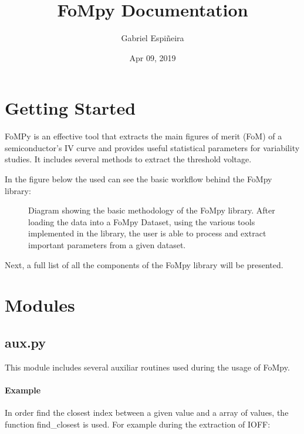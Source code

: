 \documentclass[letterpaper,10pt,english,openany, oneside]{sphinxmanual}
\title{FoMpy Documentation}
\date{Apr 09, 2019}
\author{Gabriel Espiñeira}
\let\sphinxpxdimen\pdfpxdimen\else\newdimen\sphinxpxdimen
\begin{document}
\pagestyle{empty}
\maketitle
\pagestyle{plain}
\sphinxtableofcontents
\pagestyle{normal}
\label{\detokenize{index::doc}}



\chapter{Getting Started}
\label{\detokenize{index:getting-started}}
FoMPy is an effective tool that extracts the main figures of merit (FoM) of a semiconductor’s IV curve and provides useful statistical parameters for variability studies. It includes several methods to extract the threshold voltage.

In the figure below the used can see the basic workflow behind the FoMpy library:

\begin{figure}[htbp]
\centering
\capstart

\noindent\sphinxincludegraphics[width=600\sphinxpxdimen,height=300\sphinxpxdimen]{{simplified_diagram}.jpg}
\caption{Diagram showing the basic methodology of the FoMpy library. After loading the data into a FoMpy Dataset, using the various tools implemented in the library, the user is able to process and extract important parameters from a given dataset.}\label{\detokenize{index:id1}}\end{figure}

Next, a full list of all the components of the FoMpy library will be presented.


\chapter{Modules}
\label{\detokenize{index:module-fompy.aux}}\label{\detokenize{index:modules}}

\section{aux.py}
\label{\detokenize{index:aux-py}}
This module includes several auxiliar routines used during the usage of FoMpy.
\subsubsection*{Example}

In order find the closest index between a given value and a array of values, the function
find\_closest is used. For example during the extraction of IOFF:
\end{document}
